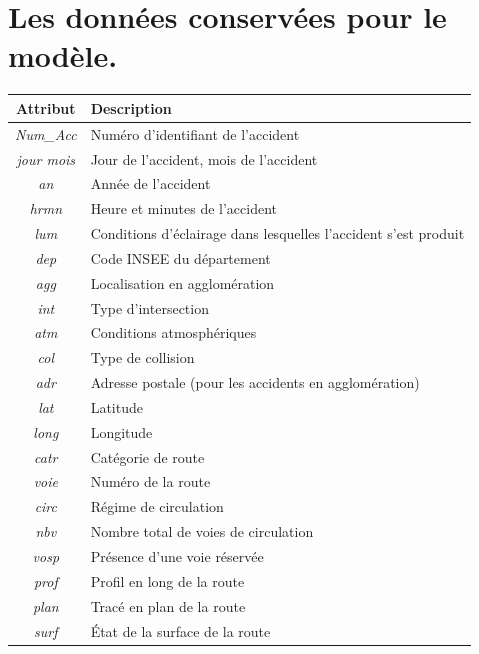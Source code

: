 \documentclass{article}
\begin{document}
    \newpage
    \appendix

    \section{Les données conservées pour le modèle.}\label{appendix:dataset}
    \begin{center}
        \begin{tabular}{ |c|p{9cm}| }
            \hline
            \textbf{Attribut} & \textbf{Description} \\
            \hline
            \textit{Num\_Acc} & Numéro d'identifiant de l'accident \\
            \textit{jour mois} & Jour de l'accident, mois de l'accident \\
            \textit{an} & Année de l'accident \\
            \textit{hrmn} & Heure et minutes de l'accident \\
            \textit{lum} & Conditions d'éclairage dans lesquelles l'accident s'est produit \\
            \textit{dep} & Code INSEE du département \\
            \textit{agg} & Localisation en agglomération \\
            \textit{int} & Type d'intersection \\
            \textit{atm} & Conditions atmosphériques \\
            \textit{col} & Type de collision \\
            \textit{adr} & Adresse postale (pour les accidents en agglomération) \\
            \textit{lat} & Latitude \\
            \textit{long} & Longitude \\
            \textit{catr} & Catégorie de route \\
            \textit{voie} & Numéro de la route \\
            \textit{circ} & Régime de circulation \\
            \textit{nbv} & Nombre total de voies de circulation \\
            \textit{vosp} & Présence d'une voie réservée \\
            \textit{prof} & Profil en long de la route \\
            \textit{plan} & Tracé en plan de la route \\
            \textit{surf} & État de la surface de la route \\

\end{tabular}
\end{center}
\end{document}
